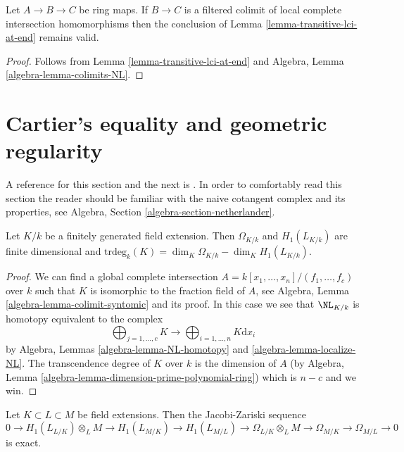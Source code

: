 \begin{lemma}
\label{lemma-transitive-colimit-lci-at-end}
Let $A \to B \to C$ be ring maps.
If $B \to C$ is a filtered colimit of local complete intersection
homomorphisms then the conclusion of
Lemma \ref{lemma-transitive-lci-at-end}
remains valid.
\end{lemma}

\begin{proof}
Follows from
Lemma \ref{lemma-transitive-lci-at-end}
and
Algebra, Lemma \ref{algebra-lemma-colimits-NL}.
\end{proof}








\section{Cartier's equality and geometric regularity}
\label{section-cartier-equality}

\noindent
A reference for this section and the next is \cite[Section 39]{MatCA}.
In order to comfortably read this section the reader should be
familiar with the naive cotangent complex and its properties, see
Algebra, Section \ref{algebra-section-netherlander}.

\begin{lemma}
\label{lemma-cartier-equality}
Let $K/k$ be a finitely generated field extension.
Then $\Omega_{K/k}$ and $H_1(L_{K/k})$ are finite dimensional and
$\text{trdeg}_k(K) = \dim_K \Omega_{K/k} - \dim_K H_1(L_{K/k})$.
\end{lemma}

\begin{proof}
We can find a global complete intersection
$A = k[x_1, \ldots, x_n]/(f_1, \ldots, f_c)$
over $k$ such that
$K$ is isomorphic to the fraction field of $A$, see
Algebra, Lemma \ref{algebra-lemma-colimit-syntomic}
and its proof. In this case we see that $\NL_{K/k}$ is homotopy
equivalent to the complex
$$
\bigoplus\nolimits_{j = 1, \ldots, c} K \longrightarrow
\bigoplus\nolimits_{i = 1, \ldots, n} K\text{d}x_i
$$
by Algebra, Lemmas \ref{algebra-lemma-NL-homotopy} and
\ref{algebra-lemma-localize-NL}.
The transcendence degree of $K$ over $k$ is the dimension of $A$
(by Algebra, Lemma \ref{algebra-lemma-dimension-prime-polynomial-ring})
which is $n - c$ and we win.
\end{proof}

\begin{lemma}
\label{lemma-transitivity-gamma}
Let $K \subset L \subset M$ be field extensions. Then the Jacobi-Zariski
sequence
$$
0 \to H_1(L_{L/K}) \otimes_L M \to
H_1(L_{M/K}) \to
H_1(L_{M/L}) \to
\Omega_{L/K} \otimes_L M \to
\Omega_{M/K} \to
\Omega_{M/L} \to 0
$$
is exact.
\end{lemma}

